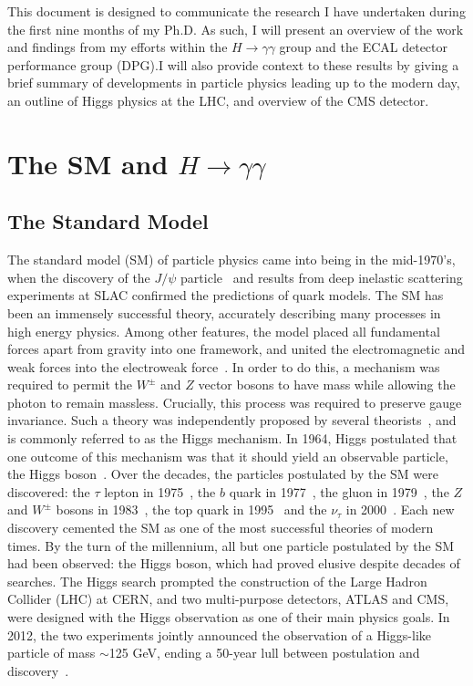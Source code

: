 \documentclass[10pt]{article}
\begin{document}
 This document is designed to communicate the research I have undertaken during the first nine months of my Ph.D. As such, I will present an overview of the work and findings from my efforts within the $H \rightarrow \gamma \gamma$ group and the ECAL detector performance group (DPG).I will also provide context to these results by giving a brief summary of developments in particle physics leading up to the modern day, an outline of Higgs physics at the LHC, and overview of the CMS detector.





\section{The SM and $H \rightarrow \gamma \gamma$}

\subsection{The Standard Model}


The standard model (SM) of particle physics came into being in the mid-1970's, when the discovery of the $J / \psi$ particle~\cite{RichterPsi,TingJ} and results from deep inelastic scattering experiments at SLAC confirmed the predictions of quark models. The SM has been an immensely successful theory, accurately describing many processes in high energy physics. Among other features, the model placed all fundamental forces apart from gravity into one framework, and united the electromagnetic and weak forces into the electroweak force~\cite{GIM,Salam,Weinberg}. In order to do this, a mechanism was required to permit the $W^{\pm}$ and $Z$ vector bosons to have mass while allowing the photon to remain massless. Crucially, this process was required to preserve gauge invariance. Such a theory was independently proposed by several theorists~\cite{BroutEnglert,Higgs1,Higgs2,Kibble1,Higgs3,Kibble2}, and is commonly referred to as the Higgs mechanism. In 1964, Higgs postulated that one outcome of this mechanism was that it should yield an observable particle, the Higgs boson~\cite{Higgs2}. Over the decades, the particles postulated by the SM were discovered: the $\tau$ lepton in 1975~\cite{tauDisc}, the $b$ quark in 1977~\cite{bquarkDisc}, the gluon in 1979~\cite{Gluon1,Gluon2,Gluon3}, the $Z$ and $W^{\pm}$ bosons in 1983~\cite{ZDisc,WDisc}, the top quark in 1995~\cite{tquarkDisc1,tquarkDisc2} and the $\nu_{\tau}$ in 2000~\cite{TauNuDisc}. Each new discovery cemented the SM as one of the most successful theories of modern times. By the turn of the millennium, all but one particle postulated by the SM had been observed: the Higgs boson, which had proved elusive despite decades of searches. The Higgs search prompted the construction of the Large Hadron Collider (LHC) at CERN, and two multi-purpose detectors, ATLAS and CMS, were designed with the Higgs observation as one of their main physics goals. In 2012, the two experiments jointly announced the observation of a Higgs-like particle of mass $\sim$125 GeV, ending a 50-year lull between postulation and discovery~\cite{CMSHDisc,ATLASHDisc}.
\end{document}
